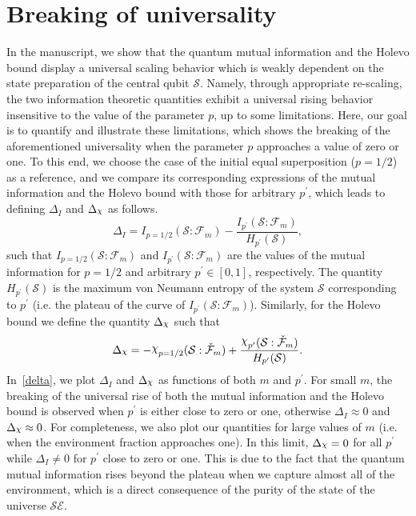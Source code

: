 \documentclass[aps,prl,showpacs,amsmath,amssymb,amsfonts,lengthcheck,onecolumn,longbibliography,superscriptaddress]{revtex4-2}
\newcommand{\cS}        {{\mathcal S}}
\newcommand{\+}         {\dagger}
\DeclareRobustCommand{\rchi}{{\mathpalette\irchi\relax}}
\newcommand{\irchi}[2]{\raisebox{\depth}{$#1\chi$}}
\newcommand{\mc}[1]{\mathcal{#1}}
\begin{document}
\section{Breaking of universality}
In the manuscript, we show that the quantum mutual information and the Holevo bound display a universal scaling behavior which is weakly dependent on the state preparation of the central qubit $\cS$. Namely, through appropriate re-scaling, the two information theoretic quantities exhibit a universal rising behavior insensitive to the value of the parameter $p$, up to some limitations. Here, our goal is to quantify and illustrate these limitations, which shows the breaking of the aforementioned universality when the parameter $p$ approaches a value of zero or one. To this end, we choose the case of the initial equal superposition ($p=1/2$) as a reference, and we compare its corresponding expressions of the mutual information and the Holevo bound with those for arbitrary $p^{\prime}$, which leads to defining $\Delta_{{I}}$ and $\Delta_{\rchi}$ as follows.
\begin{equation}
	\Delta_{{I}}={I}_{p=1/2}(\mc{S}:\mc{F}_m)-\frac{{I}_{p^{\prime}}(\mc{S}:\mc{F}_m)}{H_{p^{\prime}}(\mc{S})},
	\label{}
\end{equation}
such that ${I}_{p=1/2}(\mc{S}:\mc{F}_m)$ and ${I}_{p^{\prime}}(\mc{S}:\mc{F}_m)$ are the values of the mutual information for $p=1/2$ and arbitrary $p^{\prime}\in [0,1]$, respectively. The quantity $H_{p^{\prime}}(\mc{S})$ is the maximum von Neumann entropy of the system $\mc{S}$ corresponding to $p^{\prime}$ (i.e. the plateau of the curve of ${I}_{p^{\prime}}(\mc{S}:\mc{F}_m)$). Similarly, for the Holevo bound we define the quantity $\Delta_{\rchi}$ such that
\begin{equation}
	\Delta_{\rchi}=-\rchi_{p=1/2}(\mc{S}:\check{\mc{F}}_m)+\frac{\rchi_{p^{\prime}}(\mc{S}:\check{\mc{F}}_m)}{H_{p^{\prime}}(\mc{S})}.
	\label{}
\end{equation}
In~\cref{delta}, we plot $\Delta_{{I}}$ and $\Delta_{\rchi}$ as functions of both $m$ and $p^{\prime}$. For small $m$, the breaking of the universal rise of both the mutual information and the Holevo bound is observed when $p^{\prime}$ is either close to zero or one, otherwise $\Delta_{{I}} \approx 0$ and $\Delta_{\rchi} \approx 0$. For completeness, we also plot our quantities for large values of $m$ (i.e. when the environment fraction approaches one). In this limit, $\Delta_{\rchi} = 0$ for all $p^{\prime}$ while $\Delta_{{I}} \neq 0$ for $p^{\prime}$ close to zero or one. This is due to the fact that the quantum mutual information rises beyond the plateau when we capture almost all of the environment, which is a direct consequence of the purity of the state of the universe $\mc{S}\mc{E}$.
\end{document}
